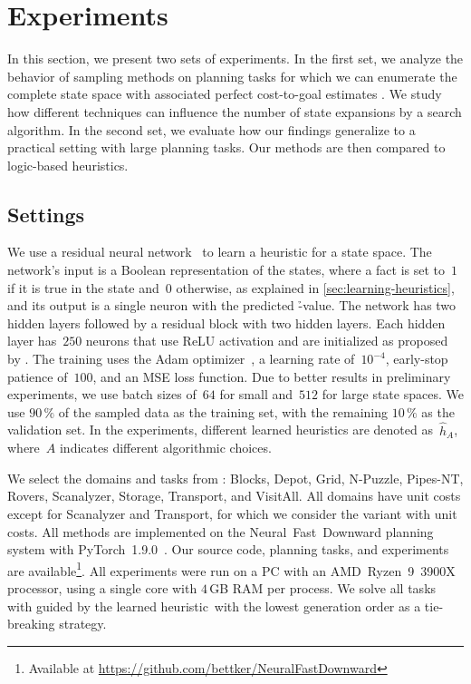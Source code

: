 \chapter{Experiments}
\label{sec:experiments}

In this section, we present two sets of experiments. In the first set, we analyze the behavior of sampling methods on planning tasks for which we can enumerate the complete state space with associated perfect cost-to-goal estimates \hstar. We study how different techniques can influence the number of state expansions by a search algorithm. In the second set, we evaluate how our findings generalize to a practical setting with large planning tasks. Our methods are then compared to logic-based heuristics.

\section{Settings}
\label{sec:settings}

We use a residual neural network~\cite{he2016deep} to learn a heuristic for a state space. The network's input is a Boolean representation of the states, where a fact is set to~$1$ if it is true in the state and~$0$ otherwise, as explained in \cref{sec:learning-heuristics}, and its output is a single neuron with the predicted \h-value. The network has two hidden layers followed by a residual block with two hidden layers. Each hidden layer has~$250$ neurons that use ReLU activation and are initialized as proposed by \citet{he2015delving}. The training uses the Adam optimizer~\cite{kingma2015adam}, a learning rate of~$10^{-4}$, early-stop patience of~$100$, and an MSE loss function. Due to better results in preliminary experiments, we use batch sizes of~$64$ for small and~$512$ for large state spaces. We use $90\,\%$ of the sampled data as the training set, with the remaining $10\,\%$ as the validation set. In the experiments, different learned heuristics are denoted as~$\hat h_A$, where~$A$ indicates different algorithmic choices.

We select the domains and tasks from \citet{ferber2022neural}: Blocks, Depot, Grid, N-Puzzle, Pipes-NT, Rovers, Scanalyzer, Storage, Transport, and VisitAll. All domains have unit costs except for Scanalyzer and Transport, for which we consider the variant with unit costs. All methods are implemented on the Neural~Fast~Downward planning system with PyTorch~1.9.0~\cite{ferber2020neural,paszke2019pytorch}. Our source code, planning tasks, and experiments are available\footnote{Available at \url{https://github.com/bettker/NeuralFastDownward}}. All experiments were run on a PC with an AMD~Ryzen~9~3900X processor, using a single core with $4$\,GB RAM per process. We solve all tasks with \gbfs guided by the learned heuristic~\hnn with the lowest generation order as a tie-breaking strategy.

